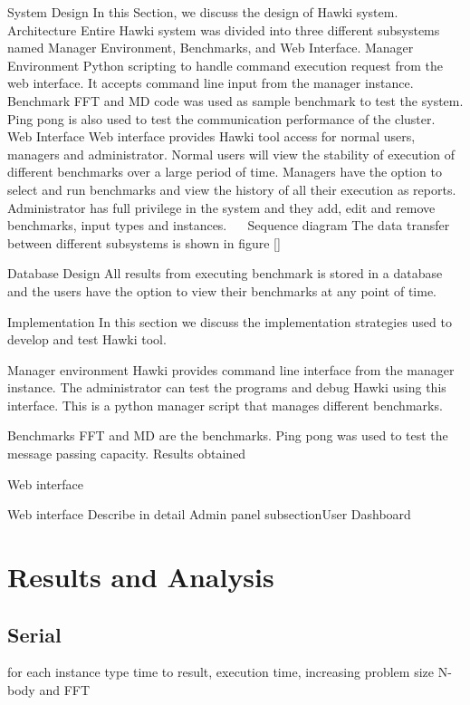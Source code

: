 \documentclass[12pt,a4paper]{report}
\begin{document}
System Design
In this Section, we discuss the design of Hawki system. 
Architecture
Entire Hawki system was divided into three different subsystems named Manager Environment, Benchmarks, and Web Interface.
Manager Environment
Python scripting to handle command execution request from the web interface. It accepts command line input from the manager instance. 
Benchmark
FFT and MD code was used as sample benchmark to test the system. Ping pong is also used to test the communication performance of the cluster.
Web Interface
Web interface provides Hawki tool access for normal users, managers and administrator. Normal users will view the stability of execution of different benchmarks over a large period of time. Managers have the option to select and run benchmarks and view the history of all their execution as reports. Administrator has full privilege in the system and they add, edit and remove benchmarks, input types and instances.
 
Sequence diagram
The data transfer between different subsystems is shown in figure []
 

Database Design
All results from executing benchmark is stored in a database and the users have the option to view their benchmarks at any point of time.



 
 
Implementation
In this section we discuss the implementation strategies used to develop and test Hawki tool.

Manager environment
Hawki provides command line interface from the manager instance. The administrator can test the programs and debug Hawki using this interface. This is a python manager script that manages different benchmarks. 

Benchmarks
FFT and MD are the benchmarks. Ping pong was used to test the message passing capacity.
Results obtained 

Web interface


Web interface
Describe in detail
Admin panel
subsectionUser Dashboard




\chapter{Results and Analysis}
\section{Serial}
for each instance type
time to result, execution time, increasing problem size
N-body and FFT
\end{document}
